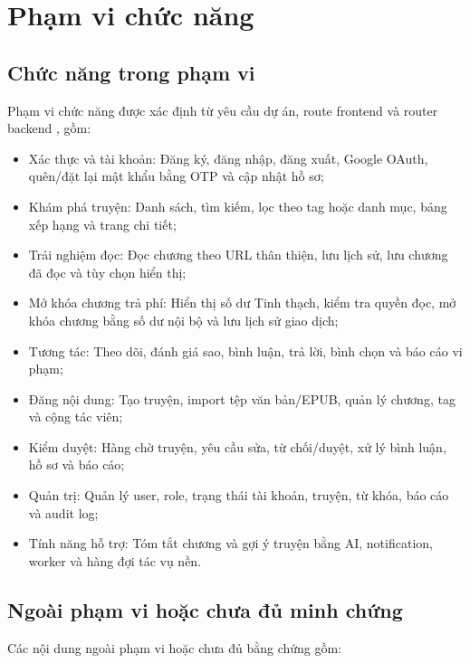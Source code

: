\section{Phạm vi chức năng}

\subsection{Chức năng trong phạm vi}

Phạm vi chức năng được xác định từ yêu cầu dự án, route frontend và router backend \cite{requirements}, gồm:

\begin{itemize}[leftmargin=4.5em, label=--, labelsep=0.6em]
  \item Xác thực và tài khoản: Đăng ký, đăng nhập, đăng xuất, Google OAuth, quên/đặt lại mật khẩu bằng OTP và cập nhật hồ sơ;
  \item Khám phá truyện: Danh sách, tìm kiếm, lọc theo tag hoặc danh mục, bảng xếp hạng và trang chi tiết;
  \item Trải nghiệm đọc: Đọc chương theo URL thân thiện, lưu lịch sử, lưu chương đã đọc và tùy chọn hiển thị;
  \item Mở khóa chương trả phí: Hiển thị số dư Tinh thạch, kiểm tra quyền đọc, mở khóa chương bằng số dư nội bộ và lưu lịch sử giao dịch;
  \item Tương tác: Theo dõi, đánh giá sao, bình luận, trả lời, bình chọn và báo cáo vi phạm;
  \item Đăng nội dung: Tạo truyện, import tệp văn bản/EPUB, quản lý chương, tag và cộng tác viên;
  \item Kiểm duyệt: Hàng chờ truyện, yêu cầu sửa, từ chối/duyệt, xử lý bình luận, hồ sơ và báo cáo;
  \item Quản trị: Quản lý user, role, trạng thái tài khoản, truyện, từ khóa, báo cáo và audit log;
  \item Tính năng hỗ trợ: Tóm tắt chương và gợi ý truyện bằng AI, notification, worker và hàng đợi tác vụ nền.
\end{itemize}


\clearpage
\subsection{Ngoài phạm vi hoặc chưa đủ minh chứng}

Các nội dung ngoài phạm vi hoặc chưa đủ bằng chứng gồm:

